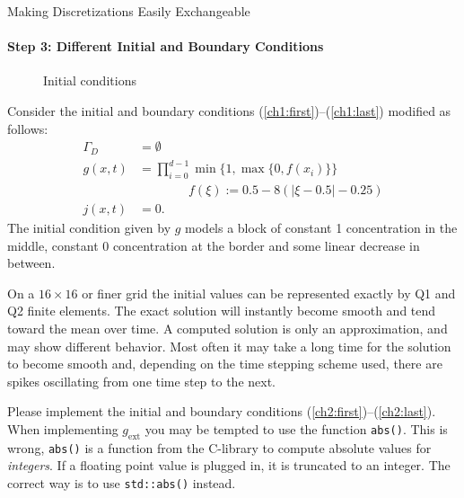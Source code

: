 \documentclass[12pt,a4paper]{article}
\begin{document}
\begin{Exercise}{Making Discretizations Easily Exchangeable}
  \paragraph{Step 3: Different Initial and Boundary Conditions}
  \quad \newline
  \begin{wrapfigure}[9]{l}{4.5cm}
    \centering
    \caption{Initial conditions}
  \end{wrapfigure}
  Consider the initial and boundary conditions
  (\ref{ch1:first})--(\ref{ch1:last}) modified as follows:
  \begin{align}
    \label{ch2:first}
    \Gamma_D&=\emptyset \\
    g(x, t) &= \prod_{i=0}^{d-1}\min\{1,\max\{0,f(x_i)\}\} \\
        & \qquad\qquad f(\xi):=0.5-8(|\xi-0.5|-0.25) \nonumber \\
    \label{ch2:last}
    j(x,t)&=0 .
  \end{align}
  The initial condition given by $g$ models a block of constant 1
  concentration in the middle, constant 0 concentration at the border
  and some linear decrease in between.

  On a $16\times16$ or finer grid the initial values can be represented
  exactly by Q1 and Q2 finite elements.  The exact solution will instantly
  become smooth and tend toward the mean over time.  A computed solution is
  only an approximation, and may show different behavior.  Most often it may
  take a long time for the solution to become smooth and, depending on
  the time stepping scheme used, there are spikes oscillating from one
  time step to the next.

  Please implement the initial and boundary conditions
  (\ref{ch2:first})--(\ref{ch2:last}). When implementing $g_\text{ext}$
  you may be tempted to use the function \lstinline!abs()!. This is
  wrong, \lstinline!abs()! is a function from the C-library to compute
  absolute values for \emph{integers}. If a floating point value is
  plugged in, it is truncated to an integer. The correct way is to use
  \lstinline!std::abs()! instead.


\end{Exercise}
\end{document}
